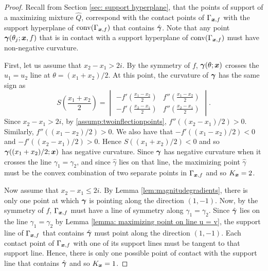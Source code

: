 \begin{proof}
			Recall from Section \ref{sec: support hyperplane}, that the points of support of a maximizing mixture $\hat{Q}$, correspond with the contact points of $\Gamma_{{\bm{{x}}}, f}$ with the support hyperplane of $\mathrm{conv}(\Gamma_{{\bm{{x}}}, f})$ that contains $\hat{{\bm{{\gamma}}}}$. Note that any point ${\bm{{\gamma}}}(\theta_j;{\bm{{x}}},f)$ that is in contact with a support hyperplane of $\mathrm{conv}(\Gamma_{{\bm{{x}}}, f})$ must have non-negative curvature.

			First, let us assume that $x_2 - x_1 > 2i$. By the symmetry of $f$, ${\bm{{\gamma}}}(\theta;{\bm{{x}}})$ crosses the $u_1 = u_2$ line at $\theta = (x_1 + x_2)/2$. At this point, the curvature of ${\bm{{\gamma}}}$ has the same sign as
			\begin{equation}
				S\left(\frac{x_1+x_2}{2}\right) = 
				\begin{vmatrix}
					-f'(\frac{x_1 - x_2}{2}) & f''(\frac{x_1 - x_2}{2})\\
					-f'(\frac{x_2 - x_1}{2}) & f''(\frac{x_2 - x_1}{2})
				\end{vmatrix}.
			\end{equation}
			Since $x_2 - x_1 > 2i$, by \ref{assump:twoinflectionpoints},  $f''((x_2 - x_1)/2)>0$. Similarly, $f''((x_1 - x_2)/2) > 0$. We also have that $-f'((x_1 - x_2)/2) < 0$ and $-f'((x_2 - x_1)/2) > 0$. Hence $S((x_1 + x_2)/2)<0$ and so ${\bm{{\gamma}}}((x_1 + x_2)/2;{\bm{{x}}})$ has negative curvature. Since ${\bm{{\gamma}}}$ has negative curvature when it crosses the line $\gamma_1 = \gamma_2$, and since $\hat{\gamma}$ lies on that line, the maximizing point $\hat{\gamma}$ must be the convex combination of two separate points in $\Gamma_{{\bm{{x}}},f}$ and so $K_{\bm{{x}}} = 2$.

			
			Now assume that $x_2 - x_1 \leq 2i$. By Lemma \ref{lem:magnitudegradients}, there is only one point at which ${\bm{{\gamma}}}$ is pointing along the direction $(1,-1)$. Now, by the symmetry of $f$, $\Gamma_{{\bm{{x}}}, f}$ must have a line of symmetry along $\gamma_1 = \gamma_2$. Since $\hat{{\bm{{\gamma}}}}$ lies on the line $\gamma_1 = \gamma_2$ by Lemma \ref{lemma: maximizing point on line u = v}, the support line of $\Gamma_{{\bm{{x}}},f}$ that contains $\hat{{\bm{{\gamma}}}}$ must point along the direction $(1, -1)$. Each contact point of $\Gamma_{{\bm{{x}}}, f}$ with one of its support lines must be tangent to that support line. Hence, there is only one possible point of contact with the support line that contains $\hat{{\bm{{\gamma}}}}$ and so $K_{\bm{{x}}} = 1$.


\end{proof}

